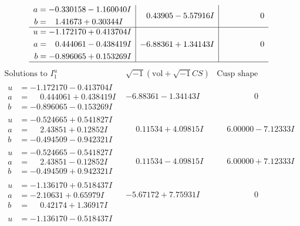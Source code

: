 \documentclass[1p]{elsarticle_modified}
\theoremstyle{definition}
\newcommand{\I}{\sqrt{-1}}
\begin{document}
$$\begin{array}{c|c|c}
\begin{aligned}
a &= -0.330158 - 1.160040 I \\
b &= \phantom{-}1.41673 + 0.30344 I\end{aligned}
 & \phantom{-}0.43905 - 5.57916 I & \phantom{-0.000000 } 0 \\ \hline\begin{aligned}
u &= -1.172170 + 0.413704 I \\
a &= \phantom{-}0.444061 - 0.438419 I \\
b &= -0.896065 + 0.153269 I\end{aligned}
 & -6.88361 + 1.34143 I & \phantom{-0.000000 } 0\\
 \hline 
 \end{array}$$\newpage$$\begin{array}{c|c|c}  
\text{Solutions to }I^u_{1}& \I (\text{vol} + \sqrt{-1}CS) & \text{Cusp shape}\\
 \hline 
\begin{aligned}
u &= -1.172170 - 0.413704 I \\
a &= \phantom{-}0.444061 + 0.438419 I \\
b &= -0.896065 - 0.153269 I\end{aligned}
 & -6.88361 - 1.34143 I & \phantom{-0.000000 } 0 \\ \hline\begin{aligned}
u &= -0.524665 + 0.541827 I \\
a &= \phantom{-}2.43851 + 0.12852 I \\
b &= -0.494509 - 0.942321 I\end{aligned}
 & \phantom{-}0.11534 + 4.09815 I & \phantom{-}6.00000 - 7.12333 I \\ \hline\begin{aligned}
u &= -0.524665 - 0.541827 I \\
a &= \phantom{-}2.43851 - 0.12852 I \\
b &= -0.494509 + 0.942321 I\end{aligned}
 & \phantom{-}0.11534 - 4.09815 I & \phantom{-}6.00000 + 7.12333 I \\ \hline\begin{aligned}
u &= -1.136170 + 0.518437 I \\
a &= -2.10631 + 0.65979 I \\
b &= \phantom{-}0.42174 + 1.36917 I\end{aligned}
 & -5.67172 + 7.75931 I & \phantom{-0.000000 } 0 \\ \hline\begin{aligned}
u &= -1.136170 - 0.518437 I \\

\end{aligned}
\end{array}$$
\end{document}
